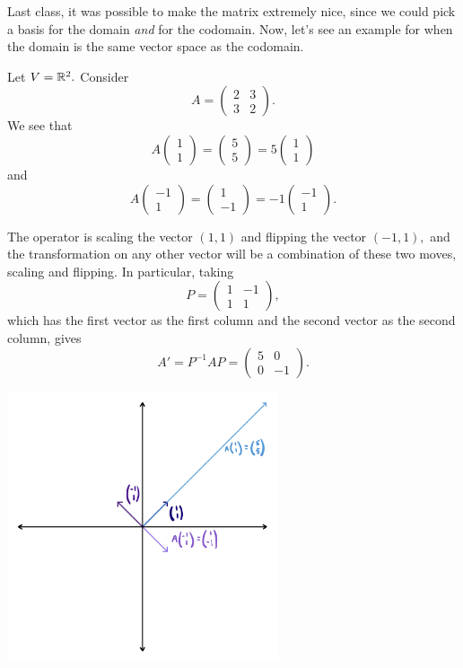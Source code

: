 Last class, it was possible to make the matrix extremely nice, since we could pick a basis for the domain \emph{and} for the codomain. Now, let's see an example for when the domain is the same vector space as the codomain. 

\begin{example}\label{diagonal matrix}
Let $V = \mathbb R^2.$ Consider \[A = \begin{pmatrix} 2 & 3 \\ 3 & 2 \end{pmatrix}.\] We see that \[A \begin{pmatrix} 1 \\ 1 \end{pmatrix} = \begin{pmatrix} 5 \\ 5 \end{pmatrix} =  5\begin{pmatrix} 1 \\ 1 \end{pmatrix}\] and \[A\begin{pmatrix} -1 \\ 1 \end{pmatrix} = \begin{pmatrix} 1 \\ -1 \end{pmatrix} = -1 \begin{pmatrix} -1 \\ 1 \end{pmatrix}.\]

The operator is scaling the vector $(1, 1)$ and flipping the vector $(-1, 1),$ and the transformation on any other vector will be a combination of these two moves, scaling and flipping. In particular, taking \[P = \begin{pmatrix} 1 & -1 \\ 1 & 1\end{pmatrix},\] which has the first vector as the first column and the second vector as the second column, gives \[A' = P^{-1}AP = \begin{pmatrix} 5 & 0 \\ 0 & -1 \end{pmatrix}.\]

\begin{center}
    \includegraphics[width=8cm]{Lecture Files and Images/lec9-1.png}
\end{center}

\end{example}

